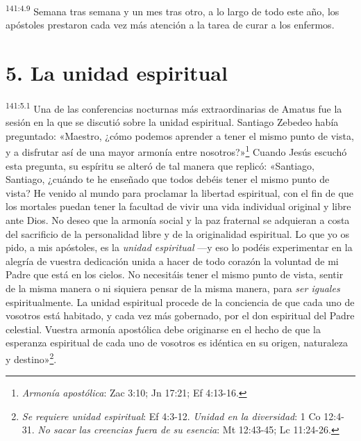 \par
\textsuperscript{141:4.9} Semana tras semana y un mes tras otro, a lo largo de todo este año, los apóstoles prestaron cada vez más atención a la tarea de curar a los enfermos.

\section*{5. La unidad espiritual}
\par
\textsuperscript{141:5.1} Una de las conferencias nocturnas más extraordinarias de Amatus fue la sesión en la que se discutió sobre la unidad espiritual. Santiago Zebedeo había preguntado: «Maestro, ¿cómo podemos aprender a tener el mismo punto de vista, y a disfrutar así de una mayor armonía entre nosotros?»\footnote{\textit{Armonía apostólica}: Zac 3:10; Jn 17:21; Ef 4:13-16.} Cuando Jesús escuchó esta pregunta, su espíritu se alteró de tal manera que replicó: «Santiago, Santiago, ¿cuándo te he enseñado que todos debéis tener el mismo punto de vista? He venido al mundo para proclamar la libertad espiritual, con el fin de que los mortales puedan tener la facultad de vivir una vida individual original y libre ante Dios. No deseo que la armonía social y la paz fraternal se adquieran a costa del sacrificio de la personalidad libre y de la originalidad espiritual. Lo que yo os pido, a mis apóstoles, es la \textit{unidad espiritual} ---y eso lo podéis experimentar en la alegría de vuestra dedicación unida a hacer de todo corazón la voluntad de mi Padre que está en los cielos. No necesitáis tener el mismo punto de vista, sentir de la misma manera o ni siquiera pensar de la misma manera, para \textit{ser iguales} espiritualmente. La unidad espiritual procede de la conciencia de que cada uno de vosotros está habitado, y cada vez más gobernado, por el don espiritual del Padre celestial. Vuestra armonía apostólica debe originarse en el hecho de que la esperanza espiritual de cada uno de vosotros es idéntica en su origen, naturaleza y destino»\footnote{\textit{Se requiere unidad espiritual}: Ef 4:3-12. \textit{Unidad en la diversidad}: 1 Co 12:4-31. \textit{No sacar las creencias fuera de su esencia}: Mt 12:43-45; Lc 11:24-26.}.

